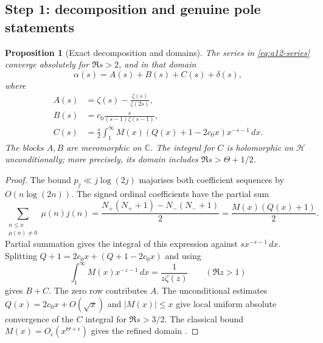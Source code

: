 \documentclass[11pt]{amsart}
\numberwithin{equation}{section}
\theoremstyle{plain}
\newtheorem{proposition}[theorem]{Proposition}
\theoremstyle{definition}
\theoremstyle{remark}
\begin{document}
\subsection{Step 1: decomposition and genuine pole statements}
\label{subsec:a12-decomposition}

\begin{proposition}[Exact decomposition and domains]
\label{prop:a12-decomposition}
The series in \eqref{eq:a12-series} converge absolutely for $\Re s>2$,
and in that domain
\begin{equation}
\label{eq:a12-ABCD}
\boxed{\alpha(s)=A(s)+B(s)+C(s)+\delta(s),}
\end{equation}
where
\begin{align}
A(s)&=\zeta(s)-\frac{\zeta(s)}{\zeta(2s)},\label{eq:a12-A}\\
B(s)&=c_0\frac{s}{(s-1)\zeta(s-1)},\label{eq:a12-B}\\
C(s)&=\frac{s}{2}\int_1^\infty
M(x)(Q(x)+1-2c_0x)x^{-s-1}\,dx.\label{eq:a12-C}
\end{align}
The blocks $A,B$ are meromorphic on $\mathbb C$.
The integral for $C$ is holomorphic on $\mathcal H$ unconditionally;
more precisely, its domain includes $\Re s>\Theta+1/2$.
\end{proposition}
\begin{proof}
The bound $p_j\ll j\log(2j)$ majorises both coefficient sequences by
$O(n\log(2n))$. The signed ordinal coefficients have the partial sum
\begin{equation}
\label{eq:a12-ordinal}
\sum_{\substack{n\le x\\\mu(n)\ne0}}\mu(n)j(n)
=\frac{N_+(N_++1)-N_-(N_-+1)}2=\frac{M(x)(Q(x)+1)}2.
\end{equation}
Partial summation gives the integral of this expression against
$sx^{-s-1}\,dx$. Splitting $Q+1=2c_0x+(Q+1-2c_0x)$ and using
\begin{equation}
\label{eq:a12-Mellin}
\int_1^\infty M(x)x^{-z-1}\,dx=\frac1{z\zeta(z)}
\qquad(\Re z>1)
\end{equation}
gives $B+C$. The zero row contributes $A$.
The unconditional estimates $Q(x)=2c_0x+O(\sqrt x)$ and $|M(x)|\le x$
give local uniform absolute convergence of the $C$ integral for $\Re s>3/2$.
The classical bound $M(x)=O_\epsilon(x^{\Theta+\epsilon})$ gives the
refined domain \cite{Titchmarsh1986}.
\end{proof}
\end{document}

